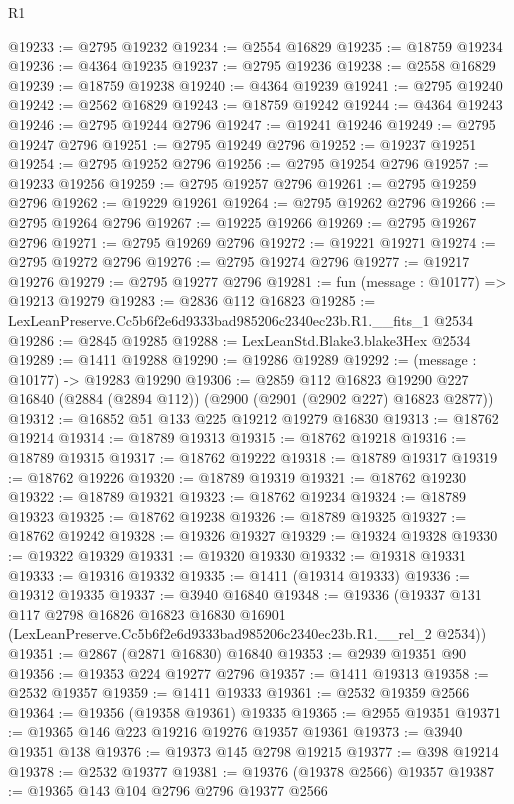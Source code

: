 \begin{lexlean}{R1}
\begin{coremodule}
@19233 := @2795 @19232
@19234 := @2554 @16829
@19235 := @18759 @19234
@19236 := @4364 @19235
@19237 := @2795 @19236
@19238 := @2558 @16829
@19239 := @18759 @19238
@19240 := @4364 @19239
@19241 := @2795 @19240
@19242 := @2562 @16829
@19243 := @18759 @19242
@19244 := @4364 @19243
@19246 := @2795 @19244 @2796
@19247 := @19241 @19246
@19249 := @2795 @19247 @2796
@19251 := @2795 @19249 @2796
@19252 := @19237 @19251
@19254 := @2795 @19252 @2796
@19256 := @2795 @19254 @2796
@19257 := @19233 @19256
@19259 := @2795 @19257 @2796
@19261 := @2795 @19259 @2796
@19262 := @19229 @19261
@19264 := @2795 @19262 @2796
@19266 := @2795 @19264 @2796
@19267 := @19225 @19266
@19269 := @2795 @19267 @2796
@19271 := @2795 @19269 @2796
@19272 := @19221 @19271
@19274 := @2795 @19272 @2796
@19276 := @2795 @19274 @2796
@19277 := @19217 @19276
@19279 := @2795 @19277 @2796
@19281 := fun (message : @10177) => @19213 @19279
@19283 := @2836 @112 @16823
@19285 := LexLeanPreserve.Cc5b6f2e6d9333bad985206c2340ec23b.R1.__fits_1 @2534
@19286 := @2845 @19285
@19288 := LexLeanStd.Blake3.blake3Hex @2534
@19289 := @1411 @19288
@19290 := @19286 @19289
@19292 := (message : @10177) -> @19283 @19290
@19306 := @2859
    @112
    @16823
    @19290
    @227
    @16840
    (@2884 (@2894 @112))
    (@2900 (@2901 (@2902 @227) @16823 @2877))
@19312 := @16852 @51 @133 @225 @19212 @19279 @16830
@19313 := @18762 @19214
@19314 := @18789 @19313
@19315 := @18762 @19218
@19316 := @18789 @19315
@19317 := @18762 @19222
@19318 := @18789 @19317
@19319 := @18762 @19226
@19320 := @18789 @19319
@19321 := @18762 @19230
@19322 := @18789 @19321
@19323 := @18762 @19234
@19324 := @18789 @19323
@19325 := @18762 @19238
@19326 := @18789 @19325
@19327 := @18762 @19242
@19328 := @19326 @19327
@19329 := @19324 @19328
@19330 := @19322 @19329
@19331 := @19320 @19330
@19332 := @19318 @19331
@19333 := @19316 @19332
@19335 := @1411 (@19314 @19333)
@19336 := @19312 @19335
@19337 := @3940 @16840
@19348 := @19336
    (@19337
      @131
      @117
      @2798
      @16826
      @16823
      @16830
      @16901
      (LexLeanPreserve.Cc5b6f2e6d9333bad985206c2340ec23b.R1.__rel_2 @2534))
@19351 := @2867 (@2871 @16830) @16840
@19353 := @2939 @19351 @90
@19356 := @19353 @224 @19277 @2796
@19357 := @1411 @19313
@19358 := @2532 @19357
@19359 := @1411 @19333
@19361 := @2532 @19359 @2566
@19364 := @19356 (@19358 @19361) @19335
@19365 := @2955 @19351
@19371 := @19365 @146 @223 @19216 @19276 @19357 @19361
@19373 := @3940 @19351 @138
@19376 := @19373 @145 @2798 @19215
@19377 := @398 @19214
@19378 := @2532 @19377
@19381 := @19376 (@19378 @2566) @19357
@19387 := @19365 @143 @104 @2796 @2796 @19377 @2566

\end{coremodule}
\end{lexlean}
